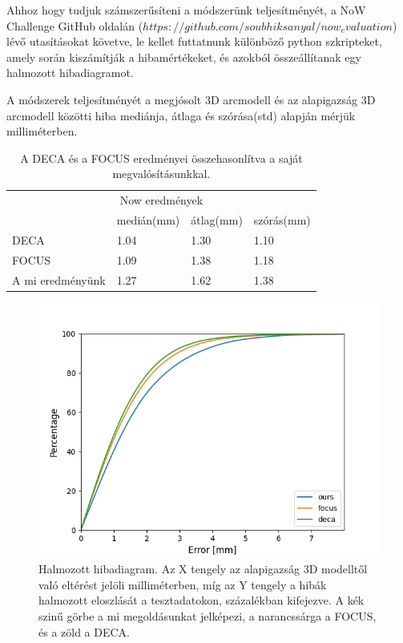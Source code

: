 \documentclass[12pt,a4]{article}
\begin{document}
            Ahhoz hogy tudjuk számszerűsíteni a módszerünk teljesítményét, a NoW Challenge GitHub oldalán ($https://github.com/soubhiksanyal/now_evaluation$) lévő utasításokat követve, le kellet futtatnunk különböző python szkripteket, amely során kiszámítják a hibamértékeket, és azokból összeállítanak egy halmozott hibadiagramot.
            
            A módszerek teljesítményét a megjósolt 3D arcmodell és az alapigazság 3D arcmodell közötti hiba mediánja, átlaga és szórása(std) alapján mérjük milliméterben. 
            
            \begin{table}[htb]\centering
            \begin{tabular}{llll}
            \multicolumn{4}{c}{Now eredmények}                 \\
                             & medián(mm) & átlag(mm) & szórás(mm) \\
            DECA             & 1.04       & 1.30     & 1.10    \\
            FOCUS            & 1.09       & 1.38     & 1.18    \\
            A mi eredményünk & 1.27       & 1.62     & 1.38   
            \end{tabular}
            \caption{A DECA és a FOCUS eredményei összehasonlítva a saját megvalósításunkkal.}
            \end{table}

            \begin{figure}[h]	
    		      \centering
    		      \includegraphics[width=1\linewidth]{cummulative-error.png}
                \caption{Halmozott hibadiagram. Az X tengely az alapigazság 3D modelltől való eltérést jelöli milliméterben, míg az Y tengely a hibák halmozott eloszlását a tesztadatokon, százalékban kifejezve. A kék szinű görbe a mi megoldásunkat jelképezi, a narancssárga a \cite{focus}FOCUS, és a zöld a \cite{DECA}DECA.}
                 \label{fig:cummulative-error}
    	    \end{figure} 
\end{document}
